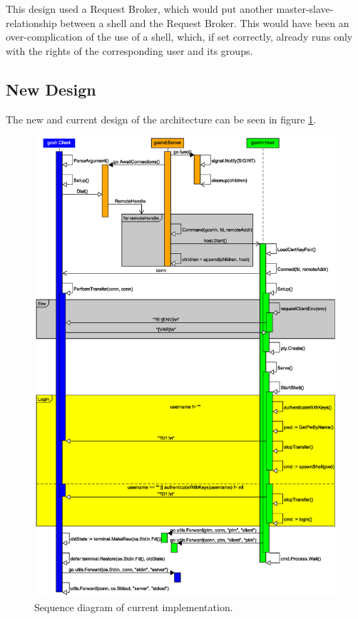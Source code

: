 \documentclass[10pt,a4paper,titlepage,twoside,english,final]{zhawreprt}
\begin{document}
This design used a \gls{Request Broker}, which would put another master-slave-relationship between a \gls{shell} and the \gls{Request Broker}.
This would have been an over-complication of the use of a \gls{shell}, which, if set correctly, already runs only with the rights of the corresponding user and its groups.

\subsection{New Design}\label{ssec:NewDesign}
The new and current design of the architecture can be seen in figure \ref{fig:SeqDiaCurrent}.
\begin{figure}[ht]
\includegraphics[width=\textwidth]{SequenceDiagramNew}
\caption{Sequence diagram of current implementation.}
\label{fig:SeqDiaCurrent}
\end{figure}
\end{document}
